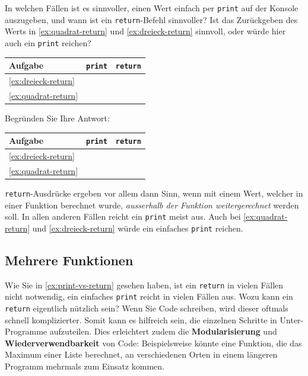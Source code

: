 \begin{myexercise}\label{ex:print-vs-return}
	In welchen Fällen ist es sinnvoller, einen Wert einfach per \lstinline|print| auf der Konsole auszugeben, und wann ist ein \lstinline|return|-Befehl sinnvoller? Ist das Zurückgeben des Werts in \cref{ex:quadrat-return} und \cref{ex:dreieck-return} sinnvoll, oder würde hier auch ein \lstinline|print| reichen?

	\begin{center}
		\begin{tabular}{lcc}
			\textbf{Aufgabe}         & \lstinline|print| & \lstinline|return| \\
			\midrule
			\cref{ex:dreieck-return} &                   &                    \\
			\midrule
			\cref{ex:quadrat-return} &                   &                    \\
		\end{tabular}
	\end{center}

	Begründen Sie Ihre Antwort:
	\begin{myanswer}
		\begin{center}
			\begin{tabular}{lcc}
				\textbf{Aufgabe}         & \lstinline|print| & \lstinline|return| \\
				\midrule
				\cref{ex:dreieck-return} & \faCheckSquare    &                    \\
				\midrule
				\cref{ex:quadrat-return} & \faCheckSquare    &                    \\
			\end{tabular}
		\end{center}
		\lstinline|return|-Ausdrücke ergeben vor allem dann Sinn, wenn mit einem Wert, welcher in einer Funktion berechnet wurde, \textit{ausserhalb der Funktion weitergerechnet} werden soll. In allen anderen Fällen reicht ein \lstinline|print| meist aus. Auch bei \cref{ex:quadrat-return} und \cref{ex:dreieck-return} würde ein einfaches \lstinline|print| reichen.
	\end{myanswer}
\end{myexercise}

\subsection{Mehrere Funktionen}
Wie Sie in \cref{ex:print-vs-return} gesehen haben, ist ein \lstinline|return| in vielen Fällen nicht notwendig, ein einfaches \lstinline|print| reicht in vielen Fällen aus. Wozu kann ein \lstinline|return| eigentlich nützlich sein? Wenn Sie Code schreiben, wird dieser oftmals schnell komplizierter. Somit kann es hilfreich sein, die einzelnen Schritte in Unter-Programme aufzuteilen. Dies erleichtert zudem die \textbf{Modularisierung} und \textbf{Wiederverwendbarkeit} von Code: Beispielsweise könnte eine Funktion, die das Maximum einer Liste berechnet, an verschiedenen Orten in einem längeren Programm mehrmals zum Einsatz kommen.


